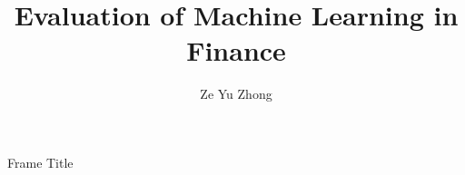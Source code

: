 \documentclass{beamer}
\title{Evaluation of Machine Learning in Finance}
\author{Ze Yu Zhong}
\begin{document}
	
\begin{frame}[plain]
    \maketitle
\end{frame}

\begin{frame}{Frame Title}
\end{frame}
\end{document}
